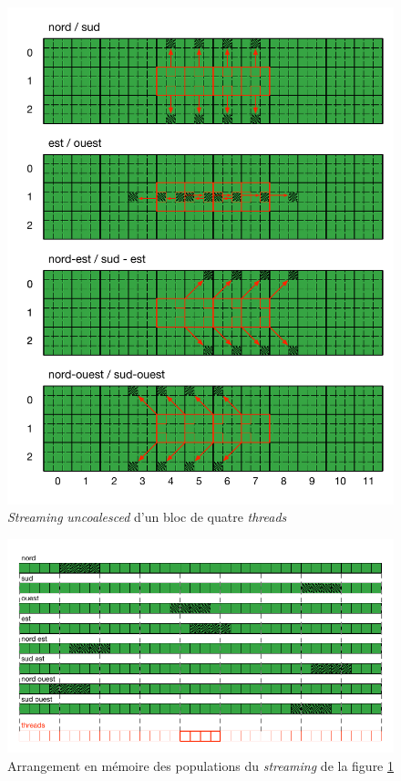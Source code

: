 \begin{figure}[h]
	\centering
	\includegraphics[fbox,scale=1.05]{images/streaming/sailfish_hist_misaligned.pdf}
	\caption{\textit{Streaming} \textit{uncoalesced} d'un bloc de quatre \textit{threads}}
	\label{fig:sailfish_hist_misaligned}
\end{figure}

\begin{figure}[h]
	\centering
	\includegraphics[fbox,scale=1.1]{images/streaming/sailfish_hist_alignment.pdf}
	\caption{Arrangement en mémoire des populations du \textit{streaming} de la figure \ref{fig:sailfish_hist_misaligned}}
	\label{fig:sailfish_hist_alignment}
\end{figure}

